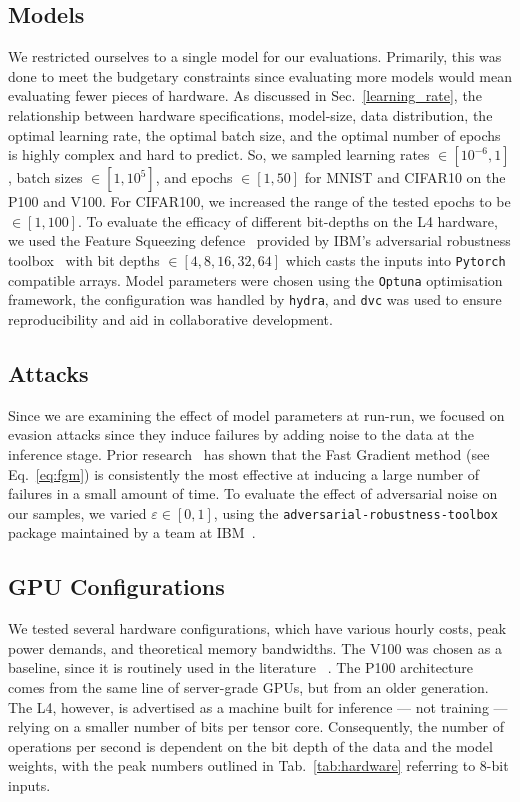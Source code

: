 \documentclass[journal]{IEEEtran}
\begin{document}
\subsection{Models}
We restricted ourselves to a single model for our evaluations. Primarily, this was done to meet the budgetary constraints since evaluating more models would mean evaluating fewer pieces of hardware. As discussed in Sec.~\ref{learning_rate}, the relationship between hardware specifications, model-size, data distribution, the optimal learning rate, the optimal batch size, and the optimal number of epochs is highly complex and hard to predict. So, we sampled learning rates $\in [10^{-6}, 1]$, batch sizes $\in [1, 10^5]$, and epochs $\in [1, 50]$ for MNIST and CIFAR10 on the P100 and V100. For CIFAR100, we increased the range of the tested epochs to be $\in [1, 100]$. To evaluate the efficacy of different bit-depths on the L4 hardware, we used the Feature Squeezing defence~\cite{feature_squeezing} provided by IBM's adversarial robustness toolbox~\cite{art2018} with bit depths $\in [4,8,16,32,64]$ which casts the inputs into \texttt{Pytorch} compatible arrays. Model parameters were chosen using the \texttt{Optuna} optimisation framework, the configuration was handled by \texttt{hydra}, and \texttt{dvc} was used to ensure reproducibility and aid in collaborative development.


\subsection{Attacks}
Since we are examining the effect of model parameters at run-run, we focused on evasion attacks since they induce failures by adding noise to the data at the inference stage. Prior research~\cite{meyers} has shown that the Fast Gradient method (see Eq.~\ref{eq:fgm}) is consistently the most effective at inducing a large number of failures in a small amount of time. To evaluate the effect of adversarial noise on our samples, we varied $\varepsilon \in [0, 1]$, using the \texttt{adversarial-robustness-toolbox} package maintained by a team at IBM~\cite{art2018}.


\subsection{GPU Configurations}
We tested several hardware configurations, which have various hourly costs, peak power demands, and theoretical memory bandwidths. The V100 was chosen as a baseline, since it is  routinely used in the literature ~\cite{svedin2021benchmarking,xu2018deep}. The P100 architecture comes from the same line of server-grade GPUs, but from an older generation. The L4, however, is advertised as a machine built for inference --- not training --- relying on a smaller number of bits per tensor core. Consequently, the number of operations per second is dependent on the bit depth of the data and the model weights, with the peak numbers outlined in Tab.~\ref{tab:hardware} referring to 8-bit inputs.
\end{document}
